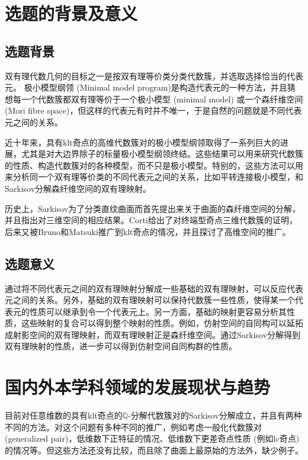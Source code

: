 
\section{选题的背景及意义}

\subsection{选题背景}
双有理代数几何的目标之一是按双有理等价类分类代数簇，并选取选择恰当的代表元。
极小模型纲领 (Minimal model program)是构造代表元的一种方法，并且猜想每一个代数簇都双有理等价于一个极小模型 (minimal model) 或一个森纤维空间 (Mori fibre space)，但这样的代表元有时并不唯一，于是自然的问题就是不同代表元之间的关系。

近十年来，具有klt奇点的高维代数簇对的极小模型纲领取得了一系列巨大的进展，尤其是对大边界除子的标量极小模型纲领终结。这些结果可以用来研究代数簇的性质、构造代数簇对的各种模型，而不只是极小模型。特别的，这些方法可以用来分析同一个双有理等价类的不同代表元之间的关系，比如平转连接极小模型，和Sarkisov分解森纤维空间的双有理映射。

历史上，Sarkisov为了分类直纹曲面而首先提出来关于曲面的森纤维空间的分解，并且指出对三维空间的相应结果。Corti给出了对终端型奇点三维代数簇的证明，后来又被Bruno和Matsuki推广到klt奇点的情况，并且探讨了高维空间的推广。

\subsection{选题意义}
通过将不同代表元之间的双有理映射分解成一些基础的双有理映射，可以反应代表元之间的关系。另外，基础的双有理映射可以保持代数簇一些性质，使得某一个代表元的性质可以继承到令一个代表元上。另一方面，基础的映射更容易分析其性质，这些映射的复合可以得到整个映射的性质。例如，仿射空间的自同构可以延拓成射影空间的双有理映射，而双有理映射正是森纤维空间。通过Sarkisov分解得到双有理映射的性质，进一步可以得到仿射空间自同构群的性质。

\section{国内外本学科领域的发展现状与趋势}
目前对任意维数的具有klt奇点的$\mathbb{Q}$-分解代数簇对的Sarkisov分解成立，并且有两种不同的方法。对这个问题有多种不同的推广，例如考虑一般化代数簇对 (generalized pair)，低维数下正特征的情况、低维数下更差奇点性质 (例如lc奇点)的情况等。但这些方法还没有比较，而且除了曲面上最原始的方法外，缺少例子。

